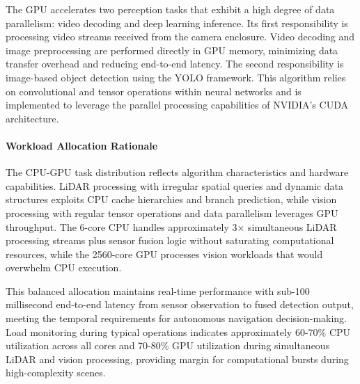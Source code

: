 
The GPU accelerates two perception tasks that exhibit a high degree of data parallelism: video decoding and deep learning inference.
Its first responsibility is processing video streams received from the camera enclosure. 
Video decoding and image preprocessing are performed directly in GPU memory, minimizing data transfer overhead and reducing end-to-end latency.
The second responsibility is image-based object detection using the \ac{YOLO} framework. 
This algorithm relies on convolutional and tensor operations within neural networks and is implemented to leverage the parallel processing capabilities of NVIDIA’s CUDA architecture.

\paragraph{Workload Allocation Rationale}

The CPU-GPU task distribution reflects algorithm characteristics and hardware capabilities.
LiDAR processing with irregular spatial queries and dynamic data structures exploits CPU cache hierarchies and branch prediction, while vision processing with regular tensor operations and data parallelism leverages GPU throughput.
The 6-core CPU handles approximately 3× simultaneous LiDAR processing streams plus sensor fusion logic without saturating computational resources, while the 2560-core GPU processes vision workloads that would overwhelm CPU execution.

This balanced allocation maintains real-time performance with sub-100 millisecond end-to-end latency from sensor observation to fused detection output, meeting the temporal requirements for autonomous navigation decision-making.
Load monitoring during typical operations indicates approximately 60-70\% CPU utilization across all cores and 70-80\% GPU utilization during simultaneous LiDAR and vision processing, providing margin for computational bursts during high-complexity scenes.



